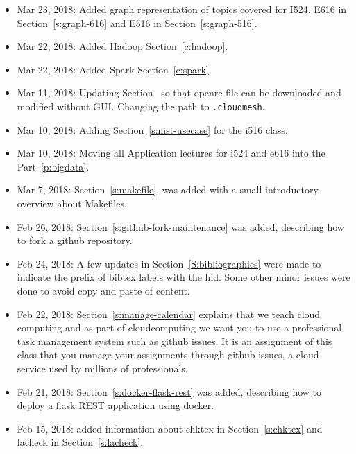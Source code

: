 \begin{itemize}
\item Mar 23, 2018: Added graph representation of topics covered for
  I524, E616 in Section~\ref{s:graph-616} and E516 in Section~\ref{s:graph-516}.

\item Mar 22, 2018: Added Hadoop Section~\ref{c:hadoop}.

\item Mar 22, 2018: Added Spark Section~\ref{c:spark}.

\item Mar 11, 2018: Updating Section~\label{s:chameleon-openstack} so
  that openrc file can be downloaded and modified without
  GUI. Changing the path to \verb|.cloudmesh|.

\item Mar 10, 2018: Adding Section~\ref{s:nist-usecase} for the i516 class.

\item Mar 10, 2018: Moving all Application lectures for i524 and e616
  into the Part~\ref{p:bigdata}.

\item Mar 7, 2018: Section~\ref{s:makefile}, was added with a small
  introductory overview about Makefiles.

\item Feb 26, 2018: Section~\ref{s:github-fork-maintenance} was added,
  describing how to fork a github repository.

\item Feb 24, 2018: A few updates in Section~\ref{S:bibliographies}
  were made to indicate the prefix of bibtex labels with the hid. Some
  other minor issues were done to avoid copy and paste of content.

\item Feb 22, 2018: Section~\ref{s:manage-calendar} explains that we
  teach cloud computing and as part of cloudcomputing we want you to
  use a professional task management system such as github issues. It
  is an assignment of this class that you manage your assignments
  through github issues, a cloud service used by millions of
  professionals.

\item Feb 21, 2018: Section~\ref{s:docker-flask-rest} was added,
    describing  how to deploy a flask REST
    application using docker. 

\item Feb 15, 2018: added information about chktex in
  Section~\ref{s:chktex} and lacheck in Section~\ref{s:lacheck}.


\end{itemize}
